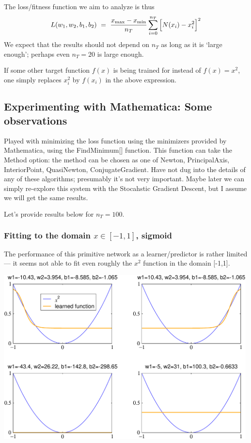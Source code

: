 \documentclass[12pt,a4paper]{article}
\begin{document}
The loss/fitness function we aim to analyze is thus 
\begin{equation}
L(w_1,w_2,b_1,b_2) ~=~  \frac{x_{\rm max} - x_{\rm min}}{n_T} \sum_{i=0}^{n_T} \Big[ N(x_i) -x_i^2 \Big]^2 
\end{equation}
%
We expect that the results should not depend on $n_T$ as long as it is `large enough'; perhaps
even $n_T=20$ is large enough. 

If some other target function $f(x)$ is being trained for instead of $f(x)=x^2$, one simply replaces
$x_i^2$ by $f(x_i)$ in the above expression.  


\subsection{Experimenting with Mathematica: Some observations}

Played with minimizing the loss function using the minimizers provided by Mathematica, using the 
FindMinimum[] function.  This function can take the Method option: the method can be chosen as one
of Newton, PrincipalAxis, InteriorPoint, QuasiNewton, ConjugateGradient.  Have not dug into the
details of any of these algorithms; presumably it's not very important.  Maybe later we can simply
re-explore this system with the Stocahstic Gradient Descent, but I assume we will get the same
results.  

Let's provide results below for $n_T=100$.  


\subsubsection{Fitting to the domain $x\in[-1,1]$, sigmoid}

The performance of this primitive network as a learner/predictor is rather limited --- it seems not
able to fit even roughly the $x^2$ function in the domain [-1,1].  

\smallskip

\begin{center}
\includegraphics[width=0.99\textwidth]{Images/3node_largedomain_learnedfunctions_a_01}
\end{center}
\end{document}
